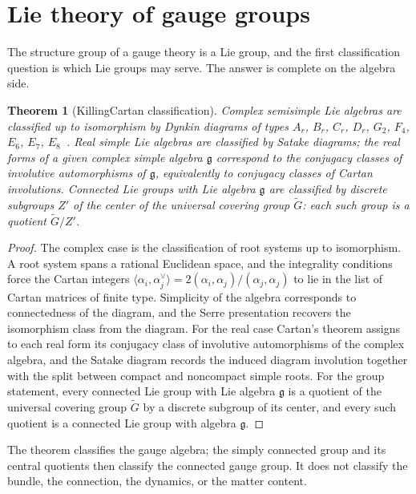 \documentclass[11pt,letterpaper]{article}
\newtheorem{theorem}{Theorem}[section]
\theoremstyle{definition}
\theoremstyle{remark}
\begin{document}
\section{Lie theory of gauge groups}
\label{sec:lie}

The structure group of a gauge theory is a Lie group, and the first classification question is which Lie groups may serve. The answer is complete on the algebra side.

\begin{theorem}[Killing\textendash{}Cartan classification]
\label{thm:killing-cartan}
Complex semisimple Lie algebras are classified up to isomorphism by Dynkin diagrams of types $A_r$, $B_r$, $C_r$, $D_r$, $G_2$, $F_4$, $E_6$, $E_7$, $E_8$~\cite{humphreys, serre}. Real simple Lie algebras are classified by Satake diagrams; the real forms of a given complex simple algebra $\mathfrak{g}$ correspond to the conjugacy classes of involutive automorphisms of $\mathfrak{g}$, equivalently to conjugacy classes of Cartan involutions. Connected Lie groups with Lie algebra $\mathfrak{g}$ are classified by discrete subgroups $Z'$ of the center of the universal covering group $\widetilde{G}$: each such group is a quotient $\widetilde{G}/Z'$.
\end{theorem}

\begin{proof}
The complex case is the classification of root systems up to isomorphism. A root system spans a rational Euclidean space, and the integrality conditions force the Cartan integers $\langle \alpha_i, \alpha_j^\vee \rangle = 2(\alpha_i, \alpha_j)/(\alpha_j, \alpha_j)$ to lie in the list of Cartan matrices of finite type. Simplicity of the algebra corresponds to connectedness of the diagram, and the Serre presentation recovers the isomorphism class from the diagram. For the real case Cartan's theorem assigns to each real form its conjugacy class of involutive automorphisms of the complex algebra, and the Satake diagram records the induced diagram involution together with the split between compact and noncompact simple roots. For the group statement, every connected Lie group with Lie algebra $\mathfrak{g}$ is a quotient of the universal covering group $\widetilde{G}$ by a discrete subgroup of its center, and every such quotient is a connected Lie group with algebra $\mathfrak{g}$.
\end{proof}

The theorem classifies the gauge algebra; the simply connected group and its central quotients then classify the connected gauge group. It does not classify the bundle, the connection, the dynamics, or the matter content.
\end{document}
